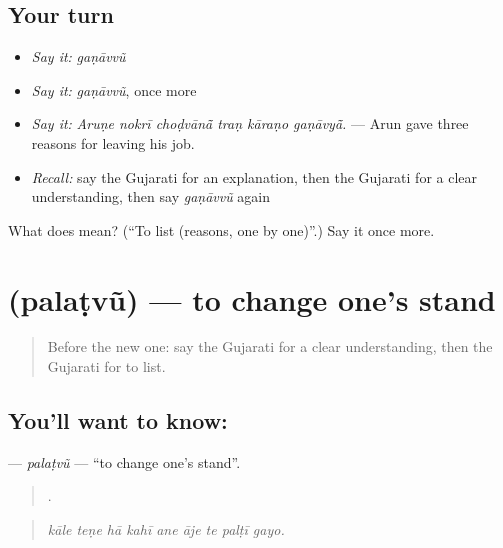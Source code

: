 \subsection*{Your turn}
\begin{itemize}
\raggedright
  \item \emph{Say it:} \emph{gaṇāvvũ}
  \item \emph{Say it:} \emph{gaṇāvvũ}, once more
  \item \emph{Say it:} \emph{Aruṇe nokrī choḍvānā̃ traṇ kāraṇo gaṇāvyā̃.} — Arun gave three reasons for leaving his job.
  \item \emph{Recall:} say the Gujarati for an explanation, then the Gujarati for a clear understanding, then say \emph{gaṇāvvũ} again
\end{itemize}

\begin{tcolorbox}[breakable,colback=teal!4,colframe=teal!35!black,title={Before you move on}]
What does  mean? (\textquotedblleft{}To list (reasons, one by one)\textquotedblright{}.) Say it once more.
\end{tcolorbox}
\section[\texorpdfstring{\gu{પલટવું} (palaṭvũ)}{પલટવું (palaṭvũ)}]{ (palaṭvũ) — to change one's stand}

\label{lesson:GU-C345-palatvu}



\begin{quote}
Before the new one: say the Gujarati for a clear understanding, then the Gujarati for to list.
\end{quote}

\subsection*{You'll want to know: }
\textbf{} — \emph{palaṭvũ} — \textquotedblleft{}to change one's stand\textquotedblright{}.

\begin{quote}
        .
\end{quote}

\begin{quote}
\emph{kāle teṇe hā kahī ane āje te palṭī gayo.}
\end{quote}


